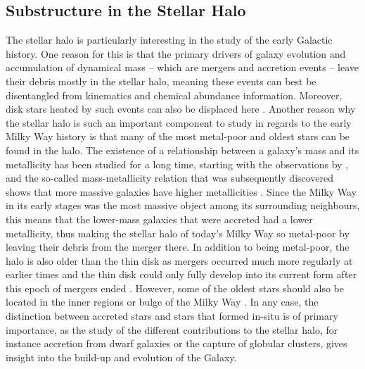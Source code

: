 \documentclass[a4paper,11pt]{article}
\begin{document}
\subsection{Substructure in the Stellar Halo} \label{substructure}
The stellar halo is particularly interesting in the study of the early Galactic history. One reason for this is that the primary drivers of galaxy evolution and accumulation of dynamical mass -- which are mergers and accretion events -- leave their debris mostly in the stellar halo, meaning these events can best be disentangled from kinematics and chemical abundance information. Moreover, disk stars heated by such events can also be displaced here \citep{tissera13}. Another reason why the stellar halo is such an important component to study in regards to the early Milky Way history is that many of the most metal-poor and oldest stars can be found in the halo. The existence of a relationship between a galaxy's mass and its metallicity has been studied for a long time, starting with the observations by \citet{lequeux79}, and the so-called mass-metallicity relation that was subsequently discovered shows that more massive galaxies have higher metallicities \citep[e.g.][]{tremonti04,maiolino08}. Since the Milky Way in its early stages was the most massive object among its surrounding neighbours, this means that the lower-mass galaxies that were accreted had a lower metallicity, thus making the stellar halo of today's Milky Way so metal-poor by leaving their debris from the merger there. In addition to being metal-poor, the halo is also older than the thin disk as mergers occurred much more regularly at earlier times and the thin disk could only fully develop into its current form after this epoch of mergers ended \citep{helmi20}. However, some of the oldest stars should also be located in the inner regions or bulge of the Milky Way \citep{elbadry18}. In any case, the distinction between accreted stars and stars that formed in-situ is of primary importance, as the study of the different contributions to the stellar halo, for instance accretion from dwarf galaxies or the capture of globular clusters, gives insight into the build-up and evolution of the Galaxy.\\ \\
%
\end{document}
